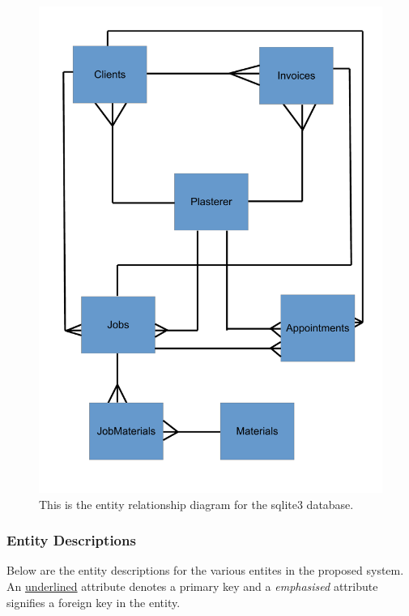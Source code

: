 \begin{figure}[H]
    \includegraphics[width=\textwidth]{./Design/images/ERDiagram.pdf}
    \caption{This is the entity relationship diagram for the sqlite3 database.} \label{fig:Entity_Relationship_Diagram}
\end{figure}

\subsubsection{Entity Descriptions}

\begin{flushleft}

Below are the entity descriptions for the various entites in the proposed system. An \underline{underlined} attribute denotes a primary key and a \emph{emphasised}	attribute signifies a foreign key in the entity.

\end{flushleft}




